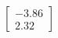 \documentclass[preview]{standalone}
\begin{document}
\begin{align*}
\begin{bmatrix} -3.86 \\ 2.32 \end{bmatrix}
\end{align*}
\end{document}
